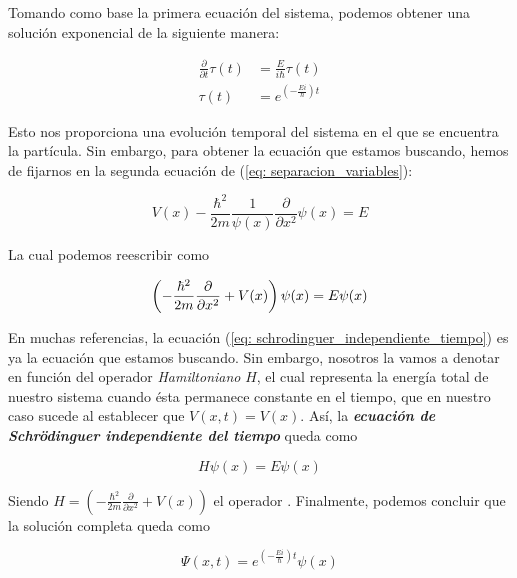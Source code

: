 \documentclass{article}
\numberwithin{equation}{section} %
\begin{document}
    Tomando como base la primera ecuación del sistema, podemos obtener una solución exponencial de la siguiente manera:
        
    \begin{align*}
        \frac{\partial}{\partial t} \tau(t) &= \frac{E}{i \hbar} \tau(t) \\[10pt]
        \tau(t) &= e ^ { \left( - \frac{Ei}{\hbar} \right) t}
    \end{align*}

    Esto nos proporciona una evolución temporal del sistema en el que se encuentra la partícula. Sin embargo, para obtener la ecuación que estamos buscando, hemos de fijarnos en la segunda ecuación de (\ref{eq: separacion_variables}):

    \begin{equation*}
        V(x) - \frac{\hbar^{2}}{2m} \frac{1}{\psi(x)} \frac{\partial}{\partial x^{2}} \psi(x) = E
    \end{equation*}

    La cual podemos reescribir como

    \begin{equation}
        \left( - \frac{\hbar^{2}}{2m} \frac{\partial}{\partial x^{2}} + V(x) \right) \psi(x) = E \psi(x) \\[5pt]
        \label{eq: schrodinguer_independiente_tiempo}
    \end{equation}

    En muchas referencias, la ecuación (\ref{eq: schrodinguer_independiente_tiempo}) es ya la ecuación que estamos buscando. Sin embargo, nosotros la vamos a denotar en función del operador \textit{Hamiltoniano} \( H \), el cual representa la energía total de nuestro sistema cuando ésta permanece constante en el tiempo, que en nuestro caso sucede al establecer que \( V(x, t) = V(x) \). Así, la \textbf{\textit{ecuación de Schrödinguer independiente del tiempo}} queda como
    
    \begin{equation}
        \boxed{ H \psi(x) = E \psi(x)}
        \label{eq: schrodinguer_independiente_tiempo_hamiltoniano}
    \end{equation}

    Siendo \( H = \left( - \frac{\hbar^{2}}{2m} \frac{\partial}{\partial x^{2}} + V(x) \right) \) el operador . Finalmente, podemos concluir que la solución completa queda como

    \begin{equation}
        \Psi(x, t) = e ^ { \left( - \frac{Ei}{\hbar} \right) t} \psi(x)
    \end{equation}
\end{document}
